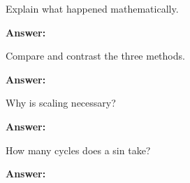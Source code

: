 \documentclass{article}
\begin{document}
\begin{enumerate}
  \begin{item}
    Explain what happened mathematically.

  \textbf{Answer:}

  \end{item}

  \begin{item}
    Compare and contrast the three methods.

  \textbf{Answer:}

  \end{item}

  \begin{item}
    Why is scaling necessary?

  \textbf{Answer:}

  \end{item}

  \begin{item}
    How many cycles does a sin take?

  \textbf{Answer:}

  \end{item}
\end{enumerate}





\end{document}
